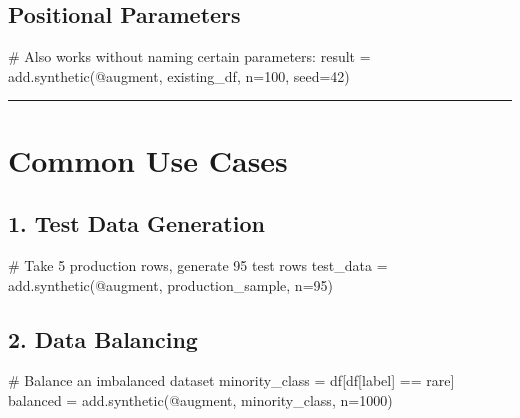 \documentclass[
  letterpaper,
]{scrbook}
\newenvironment{Shaded}{\begin{snugshade}}{\end{snugshade}}
\newcommand{\CommentTok}[1]{\textcolor[rgb]{0.37,0.37,0.37}{#1}}
\newcommand{\DecValTok}[1]{\textcolor[rgb]{0.68,0.00,0.00}{#1}}
\newcommand{\NormalTok}[1]{\textcolor[rgb]{0.00,0.23,0.31}{#1}}
\newcommand{\OperatorTok}[1]{\textcolor[rgb]{0.37,0.37,0.37}{#1}}
\newcommand{\StringTok}[1]{\textcolor[rgb]{0.13,0.47,0.30}{#1}}
\begin{document}
\subsection{Positional Parameters}\label{positional-parameters-2}

\begin{Shaded}
\begin{Highlighting}[]
\CommentTok{\# Also works without naming certain parameters:}
\NormalTok{result }\OperatorTok{=}\NormalTok{ add.synthetic(}\StringTok{\textquotesingle{}@augment\textquotesingle{}}\NormalTok{, existing\_df, n}\OperatorTok{=}\DecValTok{100}\NormalTok{, seed}\OperatorTok{=}\DecValTok{42}\NormalTok{)}
\end{Highlighting}
\end{Shaded}

\begin{center}\rule{0.5\linewidth}{0.5pt}\end{center}

\section{Common Use Cases}\label{common-use-cases}

\subsection{1. Test Data Generation}\label{test-data-generation}

\begin{Shaded}
\begin{Highlighting}[]
\CommentTok{\# Take 5 production rows, generate 95 test rows}
\NormalTok{test\_data }\OperatorTok{=}\NormalTok{ add.synthetic(}\StringTok{\textquotesingle{}@augment\textquotesingle{}}\NormalTok{, production\_sample, n}\OperatorTok{=}\DecValTok{95}\NormalTok{)}
\end{Highlighting}
\end{Shaded}

\subsection{2. Data Balancing}\label{data-balancing}

\begin{Shaded}
\begin{Highlighting}[]
\CommentTok{\# Balance an imbalanced dataset}
\NormalTok{minority\_class }\OperatorTok{=}\NormalTok{ df[df[}\StringTok{\textquotesingle{}label\textquotesingle{}}\NormalTok{] }\OperatorTok{==} \StringTok{\textquotesingle{}rare\textquotesingle{}}\NormalTok{]}
\NormalTok{balanced }\OperatorTok{=}\NormalTok{ add.synthetic(}\StringTok{\textquotesingle{}@augment\textquotesingle{}}\NormalTok{, minority\_class, n}\OperatorTok{=}\DecValTok{1000}\NormalTok{)}
\end{Highlighting}
\end{Shaded}
\end{document}
